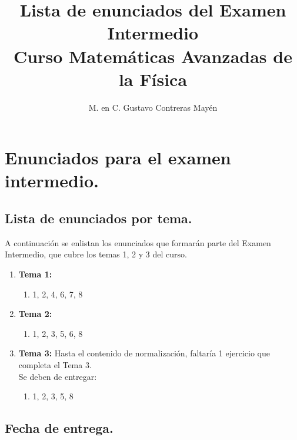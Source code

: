 
\title{Lista de enunciados del Examen Intermedio \\ \large {Curso Matemáticas Avanzadas de la Física}\vspace{-3ex}}

\author{M. en C. Gustavo Contreras Mayén}
\date{ }

\pagestyle{fancy}
\fancyhf{}
\lhead{\leftmark}
\rfoot{\thepage}
\setlength{\headheight}{16pt}%



\maketitle
\fontsize{14}{14}\selectfont

\section{Enunciados para el examen intermedio.}

\subsection{Lista de enunciados por tema.}
A continuación se enlistan los enunciados que formarán parte del Examen Intermedio, que cubre los temas 1, 2 y 3 del curso.

\begin{enumerate}
\item \textbf{Tema 1:}
\begin{enumerate}
\item 1, 2, 4, 6, 7, 8
\end{enumerate}
\item \textbf{Tema 2:}
\begin{enumerate}
\item 1, 2, 3, 5, 6, 8
\end{enumerate}
\item \textbf{Tema 3:}
Hasta el contenido de normalización, faltaría 1 ejercicio que completa el Tema 3. 
\\
Se deben de entregar:
\begin{enumerate}
\item 1, 2, 3, 5, 8
\end{enumerate}
\end{enumerate}

\subsection{Fecha de entrega.}

